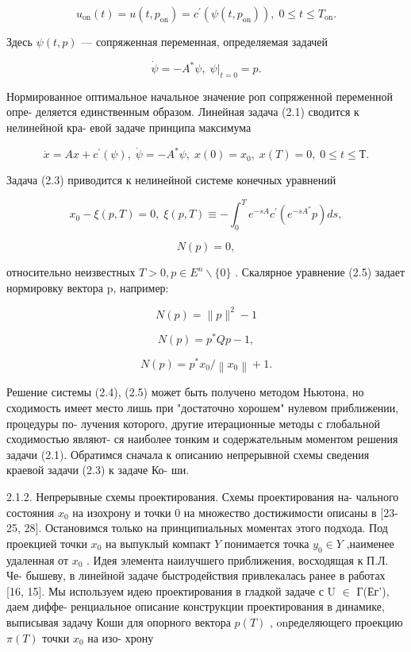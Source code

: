 \documentclass[10pt]{article}
\begin{document}
\[
{u}_{\mathrm{{on}}}\left( t\right)  = u\left( {t,{p}_{\mathrm{{on}}}}\right)  = {c}^{\prime }\left( {\psi \left( {t,{p}_{\mathrm{{on}}}}\right) }\right) ,\;0 \leq  t \leq  {T}_{\mathrm{{on}}}. \tag{2.2}
\]

Здесь \(\psi \left( {t,p}\right)\) — сопряженная переменная, определяемая задачей

\[
\dot{\psi } =  - {A}^{ * }\psi ,{\left. \;\psi \right| }_{t = 0} = p.
\]

Нормированное оптимальное начальное значение роп сопряженной переменной опре- деляется единственным образом. Линейная задача (2.1) сводится к нелинейной кра- евой задаче принципа максимума

\[
\dot{x} = {Ax} + {c}^{\prime }\left( \psi \right) ,\;\dot{\psi } =  - {A}^{ * }\psi ,\;x\left( 0\right)  = {x}_{0},\;x\left( T\right)  = 0,\;0 \leq  t \leq  Т. \tag{2.3}
\]

Задача (2.3) приводится к нелинейной системе конечных уравнений

\[
{x}_{0} - \xi \left( {p,T}\right)  = 0,\;\xi \left( {p,T}\right)  \equiv   - {\int }_{0}^{T}{e}^{-{sA}}{c}^{\prime }\left( {{e}^{-s{A}^{ * }}p}\right) {ds}, \tag{2.4}
\]

\[
N\left( p\right)  = 0, \tag{2.5}
\]

относительно неизвестных \(T > 0,p \in  {E}^{n} \smallsetminus  \{ 0\}\) . Скалярное уравнение (2.5) задает нормировку вектора p, например:

\[
N\left( p\right)  = \parallel p{\parallel }^{2} - 1
\]

\[
N\left( p\right)  = {p}^{ * }{Qp} - 1,
\]

\[
N\left( p\right)  = {p}^{ * }{x}_{0}/\left\lVert {x}_{0} \right\rVert + 1.
\]

Решение системы (2.4), (2.5) может быть получено методом Ньютона, но сходимость имеет место лишь при "достаточно хорошем" нулевом приближении, процедуры по- лучения которого, другие итерационные методы с глобальной сходимостью являют- ся наиболее тонким и содержательным моментом решения задачи (2.1). Обратимся сначала к описанию непрерывной схемы сведения краевой задачи (2.3) к задаче Ко- ши.

2.1.2. Непрерывные схемы проектирования. Схемы проектирования на- чального состояния \({x}_{0}\) на изохрону и точки 0 на множество достижимости описаны в [23-25, 28]. Остановимся только на принципиальных моментах этого подхода. Под проекцией точки \({x}_{0}\) на выпуклый компакт \(Y\) понимается точка \({y}_{0} \in  Y\) ,наименее удаленная от \({x}_{0}\) . Идея элемента наилучшего приближения, восходящая к П.Л. Че- бышеву, в линейной задаче быстродействия привлекалась ранее в работах [16, 15]. Мы используем идею проектирования в гладкой задаче с U \(\in\) Г(Ег’), даем диффе- ренциальное описание конструкции проектирования в динамике, выписывая задачу Коши для опорного вектора \(p\left( T\right)\) , onределяющего проекцию \(\pi \left( T\right)\) точки \({x}_{0}\) на изо- хрону
\end{document}
